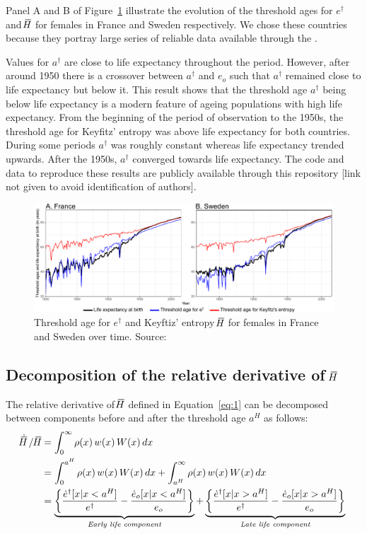 \documentclass[a4paper,twoside, openright, 12pt, leqno]{article}
\newcommand*\xbar[1]{%
   \hbox{%
     \vbox{%
       \hrule height 0.5pt %
       \kern0.3ex%
       \hbox{%
         \kern-0.25em%
         \ensuremath{#1}%
         \kern-0.05em%
       }%
     }%
   }%
}
\begin{document}
Panel A and B of Figure~\ref{fig:Fig2} illustrate the evolution of the threshold ages for $e^\dagger$ and $\xbar{H}$ for females in France and Sweden respectively. We chose these countries because they portray large series of reliable data available through the \cite{HMD}. 

Values for $a^\dagger$ are close to life expectancy throughout the period. However, after around 1950 there is a crossover between $a^\dagger$ and $e_o$ such that $a^\dagger$ remained close to life expectancy but below it. This result shows that the threshold age $a^\dagger$ being below life expectancy is a modern feature of ageing populations with high life expectancy. From the beginning of the period of observation to the 1950s, the threshold age for Keyfitz' entropy was above life expectancy for both countries. During some periods $a^\dagger$ was roughly constant whereas life expectancy trended upwards. After the 1950s, $a^\dagger$ converged towards life expectancy. The code and data to reproduce these results are publicly available through this repository [link not given to avoid identification of authors].

\begin{figure}[h]
  \centering
  \includegraphics[scale=.72]{Figures/Threshold_ages}
  \caption{Threshold age for $e^\dagger$ and Keyftiz' entropy $\xbar{H}$ for females in France and Sweden over time. Source: \cite{HMD}}
  \label{fig:Fig2}
\end{figure}

\FloatBarrier

\subsection{Decomposition of the relative derivative of $\xbar{H}$}

The relative derivative of $\xbar{H}$ defined in Equation~\eqref{eq:1} can be decomposed between components before and after the threshold age $a^H$ as follows:
%
\begin{equation}
 \begin{split}
 \dot{\xbar{H}}\,/\,\xbar{H} &= \int_0^\infty\rho(x)\,w(x)\,W(x)\,dx\;\\
  & = \int_0^{a^H} \rho(x)\,w(x)\,W(x)\,dx + \int_{a^H}^\infty\rho(x)\,w(x)\,W(x)\,dx		 \\
		& = \underbrace{ \left\lbrace \frac{\dot{e}^\dagger[x|x < a^H]}{e^\dagger}- \frac{\dot{e}_o[x|x < a^H]}{e_o}  \right\rbrace }_{\textit{Early life component}} + \underbrace{\left\lbrace \frac{\dot{e}^\dagger[x|x > a^H]}{e^\dagger}-\frac{\dot{e}_o[x|x > a^H]}{e_o} \right\rbrace }_{\textit{Late life component}}
 \end{split}
 \label{Components2}
\end{equation}
\end{document}
